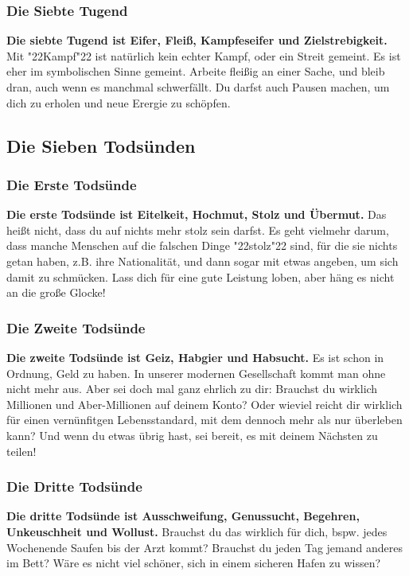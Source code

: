 \documentclass[10pt,a5paper]{article}
\newcommand{\q}[1]{\char"22{#1}\char"22 }
\begin{document}
	\subsubsection{Die Siebte Tugend}
		\textbf{Die siebte Tugend ist Eifer,
		Flei{\ss},
		Kampfeseifer und Zielstrebigkeit.}
		Mit \q{Kampf} ist nat\"urlich kein echter Kampf,
		oder ein Streit gemeint.
		Es ist eher im symbolischen Sinne gemeint.
		Arbeite flei{\ss}ig an einer Sache,
		und bleib dran,
		auch wenn es manchmal schwerf\"allt.
		Du darfst auch Pausen machen,
		um dich zu erholen und neue Erergie zu sch\"opfen.

	\subsection{Die Sieben Tods\"unden}
	
	\subsubsection{Die Erste Tods\"unde}
		\textbf{Die erste Tods\"unde ist Eitelkeit,
		Hochmut,
		Stolz und \"Ubermut.}
		Das hei{\ss}t nicht,
		dass du auf nichts mehr stolz sein darfst.
		Es geht vielmehr darum,
		dass manche Menschen auf die falschen Dinge \q{stolz} sind,
		f\"ur die sie nichts getan haben,
		z.B. ihre Nationalit\"at,
		und dann sogar mit etwas angeben,
		um sich damit zu schm\"ucken.
		Lass dich f\"ur eine gute Leistung loben,
		aber h\"ang es nicht an die gro{\ss}e Glocke!

	\subsubsection{Die Zweite Tods\"unde}
		\textbf{Die zweite Tods\"unde ist Geiz,
		Habgier und Habsucht.}
		Es ist schon in Ordnung,
		Geld zu haben.
		In unserer modernen Gesellschaft kommt man ohne nicht mehr aus.
		Aber sei doch mal ganz ehrlich zu dir:
		Brauchst du wirklich Millionen und Aber-Millionen auf deinem Konto?
		Oder wieviel reicht dir wirklich f\"ur einen vern\"unfitgen Lebensstandard,
		mit dem dennoch mehr als nur \"uberleben kann?
		Und wenn du etwas \"ubrig hast,
		sei bereit,
		es mit deinem N\"achsten zu teilen!
	
	\subsubsection{Die Dritte Tods\"unde}
		\textbf{Die dritte Tods\"unde ist Ausschweifung,
		Genussucht,
		Begehren,
		Unkeuschheit und Wollust.}
		Brauchst du das wirklich f\"ur dich,
		bspw. jedes Wochenende Saufen bis der Arzt kommt?
		Brauchst du jeden Tag jemand anderes im Bett?
		W\"are es nicht viel sch\"oner,
		sich in einem sicheren Hafen zu wissen?
	
\end{document}
